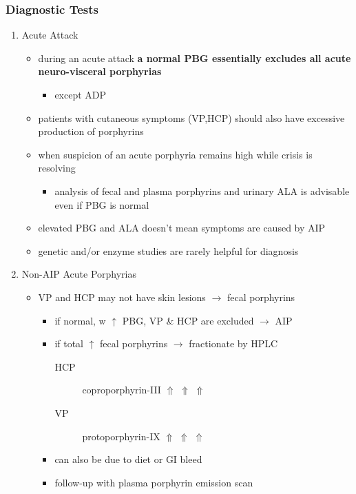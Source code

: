\documentclass{scrartcl}
\begin{document}
\subsubsection{Diagnostic Tests}
\label{sec:orgfe827f3}
\begin{enumerate}
\item Acute Attack
\label{sec:org85b0e73}
\begin{itemize}
\item during an acute attack \textbf{a normal PBG essentially excludes all acute
neuro-visceral porphyrias}
\begin{itemize}
\item except ADP
\end{itemize}
\item patients with cutaneous symptoms (VP,HCP) should also have excessive
production of porphyrins
\item when suspicion of an acute porphyria remains high while crisis is
resolving
\begin{itemize}
\item analysis of fecal and plasma porphyrins and urinary ALA is
advisable even if PBG is normal
\end{itemize}
\item elevated PBG and ALA doesn't mean symptoms are caused by AIP
\item genetic and/or enzyme studies are rarely helpful for diagnosis
\end{itemize}

\item Non-AIP Acute Porphyrias
\label{sec:org7ae0f05}
\begin{itemize}
\item VP and HCP may not have skin lesions \(\to\) fecal porphyrins
\begin{itemize}
\item if normal, w \(\uparrow\) PBG, VP \& HCP are excluded \(\to\) AIP
\item if total \(\uparrow\) fecal porphyrins \(\to\) fractionate by HPLC
\begin{description}
\item[{HCP}] coproporphyrin-III \(\Uparrow\) \(\Uparrow\) \(\Uparrow\)
\item[{VP}] protoporphyrin-IX \(\Uparrow\) \(\Uparrow\) \(\Uparrow\)
\end{description}
\item can also be due to diet or GI bleed
\item follow-up with plasma porphyrin emission scan
\end{itemize}
\end{itemize}
\end{enumerate}
\end{document}

